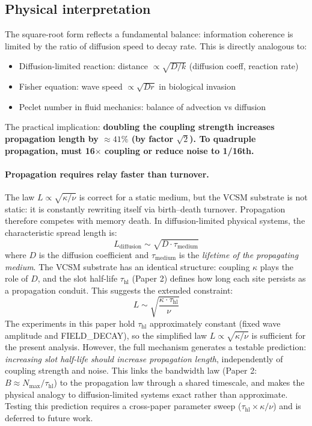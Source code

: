 \documentclass[11pt]{article}
\begin{document}
\subsection{Physical interpretation}

The square-root form reflects a fundamental balance: information coherence is limited by the ratio of diffusion speed to decay rate. This is directly analogous to:
\begin{itemize}
  \item Diffusion-limited reaction: distance $\propto \sqrt{D / k}$ (diffusion coeff, reaction rate)
  \item Fisher equation: wave speed $\propto \sqrt{D r}$ in biological invasion
  \item Peclet number in fluid mechanics: balance of advection vs diffusion
\end{itemize}

The practical implication: \textbf{doubling the coupling strength increases propagation length by $\approx 41\%$ (by factor $\sqrt{2}$). To quadruple propagation, must 16$\times$ coupling or reduce noise to 1/16th.}

\paragraph{Propagation requires relay faster than turnover.}
The law $L \propto \sqrt{\kappa/\nu}$ is correct for a static medium, but the VCSM substrate is not static: it is constantly rewriting itself via birth--death turnover. Propagation therefore competes with memory death. In diffusion-limited physical systems, the characteristic spread length is:
\[
  L_{\text{diffusion}} \sim \sqrt{D \cdot \tau_{\text{medium}}}
\]
where $D$ is the diffusion coefficient and $\tau_{\text{medium}}$ is the \emph{lifetime of the propagating medium}. The VCSM substrate has an identical structure: coupling $\kappa$ plays the role of $D$, and the slot half-life $\tau_{\text{hl}}$ (Paper 2) defines how long each site persists as a propagation conduit. This suggests the extended constraint:
\[
  L \sim \sqrt{\frac{\kappa \cdot \tau_{\text{hl}}}{\nu}}
\]
The experiments in this paper hold $\tau_{\text{hl}}$ approximately constant (fixed wave amplitude and FIELD\_DECAY), so the simplified law $L \propto \sqrt{\kappa/\nu}$ is sufficient for the present analysis. However, the full mechanism generates a testable prediction: \emph{increasing slot half-life should increase propagation length}, independently of coupling strength and noise. This links the bandwidth law (Paper 2: $B \approx N_{\max}/\tau_{\text{hl}}$) to the propagation law through a shared timescale, and makes the physical analogy to diffusion-limited systems exact rather than approximate. Testing this prediction requires a cross-paper parameter sweep ($\tau_{\text{hl}} \times \kappa/\nu$) and is deferred to future work.
\end{document}
